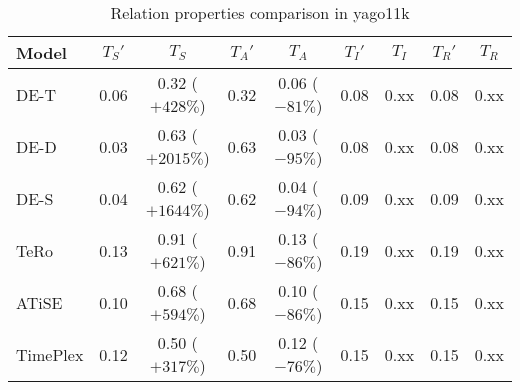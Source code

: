 \begin{table*}[htb]
\centering
\begin{minipage}{0.95\textwidth}
\centering
\caption{Relation properties comparison in yago11k}
\vspace{-3mm}

\begin{tabular}{l|cc|cc|cc|cc}\hline
Model       & $T_S'$ & $T_S$ & $T_A'$ & $T_A$ & $T_I'$ & $T_I$ & $T_R'$ & $T_R$ \\ \hline
DE-T & 0.06 & 0.32 (\textcolor{textgreen}{$+428\%$}) & 0.32 & 0.06 (\textcolor{textred}{$-81\%$}) & 0.08 & 0.xx & 0.08 & 0.xx \\ 
DE-D & 0.03 & 0.63 (\textcolor{textgreen}{$+2015\%$}) & 0.63 & 0.03 (\textcolor{textred}{$-95\%$}) & 0.08 & 0.xx & 0.08 & 0.xx \\ 
DE-S & 0.04 & 0.62 (\textcolor{textgreen}{$+1644\%$}) & 0.62 & 0.04 (\textcolor{textred}{$-94\%$}) & 0.09 & 0.xx & 0.09 & 0.xx \\ 
TeRo & 0.13 & 0.91 (\textcolor{textgreen}{$+621\%$}) & 0.91 & 0.13 (\textcolor{textred}{$-86\%$}) & 0.19 & 0.xx & 0.19 & 0.xx \\ 
ATiSE & 0.10 & 0.68 (\textcolor{textgreen}{$+594\%$}) & 0.68 & 0.10 (\textcolor{textred}{$-86\%$}) & 0.15 & 0.xx & 0.15 & 0.xx \\ 
TimePlex & 0.12 & 0.50 (\textcolor{textgreen}{$+317\%$}) & 0.50 & 0.12 (\textcolor{textred}{$-76\%$}) & 0.15 & 0.xx & 0.15 & 0.xx \\ 
 \hline
\end{tabular}

\label{fig:relation_properties_yago11k_comparison}
\end{minipage}
\end{table*}

